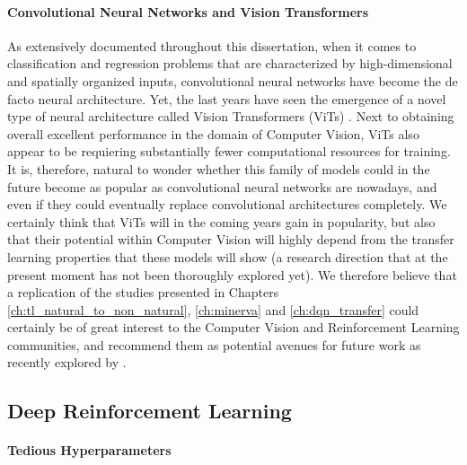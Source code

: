 \paragraph{\textbf{\uppercase{C}onvolutional \uppercase{N}eural \uppercase{N}etworks and \uppercase{V}ision \uppercase{T}ransformers}}
As extensively documented throughout this dissertation, when it comes to classification and regression problems that are characterized by high-dimensional and spatially organized inputs, convolutional neural networks have become the de facto neural architecture. Yet, the last years have seen the emergence of a novel type of neural architecture called Vision Transformers (ViTs) \cite{dosovitskiy2020image}. Next to obtaining overall excellent performance in the domain of Computer Vision, ViTs also appear to be requiering substantially fewer computational resources for training. It is, therefore, natural to wonder whether this family of models could in the future become as popular as convolutional neural networks are nowadays, and even if they could eventually replace convolutional architectures completely. We certainly think that ViTs will in the coming years gain in popularity, but also that their potential within Computer Vision will highly depend from the transfer learning properties that these models will show (a research direction that at the present moment has not been thoroughly explored yet). We therefore believe that a replication of the studies presented in Chapters \ref{ch:tl_natural_to_non_natural}, \ref{ch:minerva} and \ref{ch:dqn_transfer} could certainly be of great interest to the Computer Vision and Reinforcement Learning communities, and recommend them as potential avenues for future work as recently explored by \citet{liu2021efficient}.

\subsection{Deep Reinforcement Learning}
\paragraph{\textbf{\uppercase{T}edious \uppercase{H}yperparameters}}

